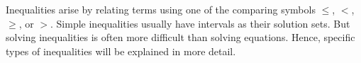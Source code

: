 



%
%

\begin{MSectionStart}

Inequalities arise by relating terms using one of the comparing symbols $\leq$, $<$, $\geq$, or $>$. Simple 
inequalities usually have intervals as their solution sets. But solving inequalities is often
more difficult than solving equations. Hence, specific types of inequalities will be explained
in more detail.


\MModstartBox
\end{MSectionStart}


